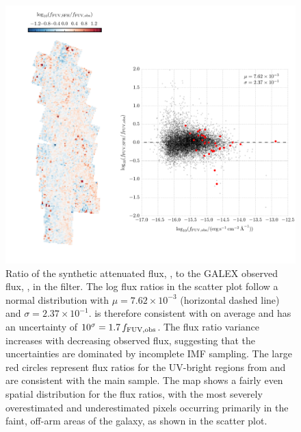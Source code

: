 \begin{figure}
\centering
\includegraphics[width=\textwidth]{m31flux-figures/flux_fuv_sfh-vs-obs.pdf}
\caption[Ratio of the synthetic flux to the observed flux in the \fuv{}
filter.]{Ratio of the synthetic attenuated flux, \ffuvsfh{}, to the GALEX
    observed flux, \ffuvobs{}, in the \fuv{} filter. The log flux ratios in the
    scatter plot follow a normal distribution with $\mu = 7.62\times 10^{-3}$
    (horizontal dashed line) and $\sigma = 2.37\times 10^{-1}$. \ffuvsfh{} is
    therefore consistent with \ffuvobs{} on average and has an uncertainty of
    $10^\sigma = 1.7\, f_{\mathrm{FUV},\mathrm{obs}}$. The flux ratio variance increases with
    decreasing observed flux, suggesting that the uncertainties are dominated
    by incomplete IMF sampling. The large red circles represent flux ratios for
    the UV-bright regions from \citet{Simones:2014} and are consistent with the
    main sample. The map shows a fairly even spatial distribution for the flux
    ratios, with the most severely overestimated and underestimated pixels
    occurring primarily in the faint, off-arm areas of the galaxy, as shown in
    the scatter plot.
}
\label{fig:mfx:fuvfluxratio}
\end{figure}


